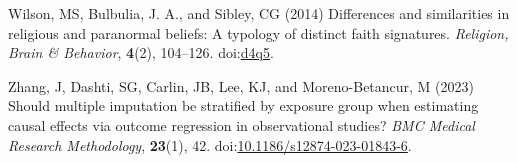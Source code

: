 \documentclass[
  singlecolumn,
  9pt]{article}
\newlength{\cslhangindent}
\newenvironment{CSLReferences}[2] %
 {\begin{list}{}{%
  \setlength{\itemindent}{0pt}
  \setlength{\leftmargin}{0pt}
  \setlength{\parsep}{0pt}
  \ifodd #1
   \setlength{\leftmargin}{\cslhangindent}
   \setlength{\itemindent}{-1\cslhangindent}
  \fi
  \setlength{\itemsep}{#2\baselineskip}}}
 {\end{list}}
\begin{document}
\begin{CSLReferences}{1}{0}
Wilson, MS, Bulbulia, J. A., and Sibley, CG (2014) Differences and
similarities in religious and paranormal beliefs: A typology of distinct
faith signatures. \emph{Religion, Brain \& Behavior}, \textbf{4}(2),
104--126. doi:\href{https://doi.org/d4q5}{d4q5}.

Zhang, J, Dashti, SG, Carlin, JB, Lee, KJ, and Moreno-Betancur, M (2023)
Should multiple imputation be stratified by exposure group when
estimating causal effects via outcome regression in observational
studies? \emph{BMC Medical Research Methodology}, \textbf{23}(1), 42.
doi:\href{https://doi.org/10.1186/s12874-023-01843-6}{10.1186/s12874-023-01843-6}.

\end{CSLReferences}
\end{document}
